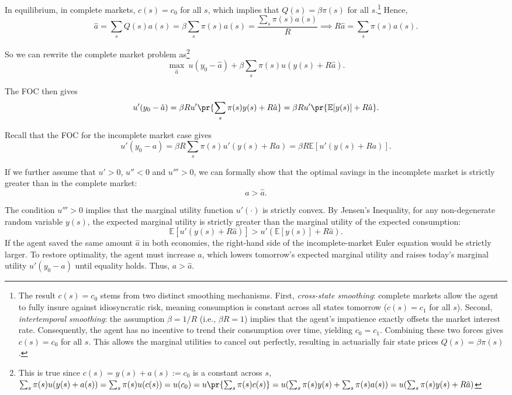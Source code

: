 In equilibrium, in complete markets, $c(s) = c_0$ for all $s$, which implies that $Q(s) = \beta \pi(s)$ for all $s$.\footnote{
    The result $c(s) = c_0$ stems from two distinct smoothing mechanisms. First, \textit{cross-state smoothing}: complete markets allow the agent to fully insure against idiosyncratic risk, meaning consumption is constant across all states tomorrow ($c(s) = c_1$ for all $s$). Second, \textit{intertemporal smoothing}: the assumption $\beta = 1/R$ (i.e., $\beta R = 1$) implies that the agent's impatience exactly offsets the market interest rate. Consequently, the agent has no incentive to trend their consumption over time, yielding $c_0 = c_1$. Combining these two forces gives $c(s) = c_0$ for all $s$. This allows the marginal utilities to cancel out perfectly, resulting in actuarially fair state prices $Q(s) = \beta \pi(s)$.
} Hence, 
\[
\hat a = \sum_s Q(s)a(s) = \beta \sum_s \pi(s) a(s) = \frac{\sum_s \pi(s)a(s)}{R}\implies R\hat a  = \sum_s \pi(s)a(s).
\]

So we can rewrite the complete market problem as\footnote{
    This is true since $c(s)  = y(s) + a(s) := c_0$ is a constant across $s$, $\sum_s\pi(s)u(y(s)+a(s)) = \sum_s\pi(s)u(c(s)) = u(c_0) = u\pr{\sum_s\pi(s)c(s)} = u(\sum_s\pi(s)y(s) + \sum_s\pi(s)a(s)) = u(\sum_s \pi(s)y(s) + R\hat a)$
}
\[
\max_{\hat a} \ u(y_0 - \hat a) + \beta \sum_s \pi(s) u(y(s) + R\hat a).
\]

The FOC then gives
\[
u'(y_0 - \hat a) = \beta R u'\pr{\sum_s\pi(s)y(s) + R\hat a} = \beta R u'\pr{\mathbb E[y(s)] + R\hat a}.
\]

Recall that the FOC for the incomplete market case gives
\[
u'(y_0 - a) = \beta R \sum_s\pi(s)u'(y(s) + Ra) = \beta R\mathbb E[u'(y(s) + Ra)].
\]

If we further assume that $u'>0$, $u''<0$ and \textbf{$u''' > 0$}, we can formally show that the optimal savings in the incomplete market is strictly greater than in the complete market:
\[
a > \hat a.
\] 

The condition $u''' > 0$ implies that the marginal utility function $u'(\cdot)$ is strictly convex. By Jensen's Inequality, for any non-degenerate random variable $y(s)$, the expected marginal utility is strictly greater than the marginal utility of the expected consumption:
    \[
    \mathbb E[u'(y(s) + R\hat a)] > u'(\mathbb E[y(s)] + R\hat a).
    \]
    If the agent saved the same amount $\hat a$ in both economies, the right-hand side of the incomplete-market Euler equation would be strictly larger. To restore optimality, the agent must increase $a$, which lowers tomorrow's expected marginal utility and raises today's marginal utility $u'(y_0 - a)$ until equality holds. Thus, $a > \hat a$.

